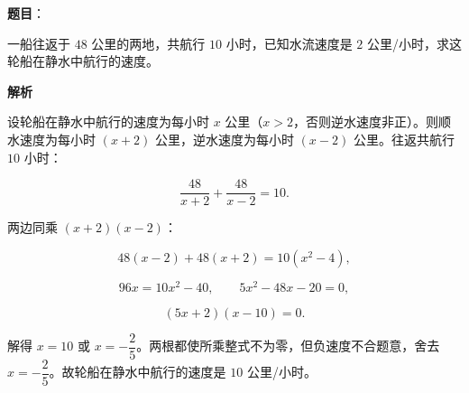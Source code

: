 \begin{answer}

\textbf{题目}：

一船往返于 $48$ 公里的两地，共航行 $10$ 小时，已知水流速度是 $2$ 公里/小时，求这轮船在静水中航行的速度。

\textbf{解析}

设轮船在静水中航行的速度为每小时 $x$ 公里（$x>2$，否则逆水速度非正）。则顺水速度为每小时 $(x+2)$ 公里，逆水速度为每小时 $(x-2)$ 公里。往返共航行 $10$ 小时：

\nopagebreak[4]
\[
\frac{48}{x+2}+\frac{48}{x-2}=10.
\]

两边同乘 $(x+2)(x-2)$：

\nopagebreak[4]
\[
48(x-2)+48(x+2)=10(x^2-4),
\]

\nopagebreak[4]
\[
96x=10x^2-40,
\qquad
5x^2-48x-20=0,
\]

\nopagebreak[4]
\[
(5x+2)(x-10)=0.
\]

解得 $x=10$ 或 $x=-\dfrac25$。两根都使所乘整式不为零，但负速度不合题意，舍去 $x=-\dfrac25$。故轮船在静水中航行的速度是 $10$ 公里/小时。


\end{answer}

